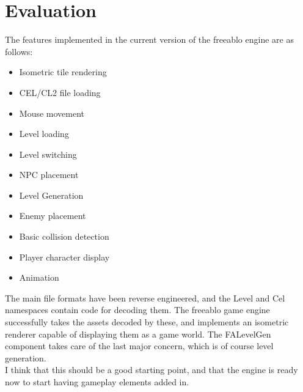 \chapter{Evaluation}
	The features implemented in the current version of the freeablo engine are as follows:\\
	\begin{itemize}
		\item{Isometric tile rendering}
		\item{CEL/CL2 file loading}
		\item{Mouse movement}
		\item{Level loading}
		\item{Level switching}
		\item{NPC placement}
		\item{Level Generation}
		\item{Enemy placement}
		\item{Basic collision detection}
		\item{Player character display}
		\item{Animation}
	\end{itemize}
	
	The main file formats have been reverse engineered, and the Level and Cel namespaces contain code for decoding them. The freeablo game engine successfully takes the assets decoded by these, and implements an isometric renderer capable of displaying them as a game world. The FALevelGen component takes care of the last major concern, which is of course level generation.\\
	I think that this should be a good starting point, and that the engine is ready now to start having gameplay elements added in.